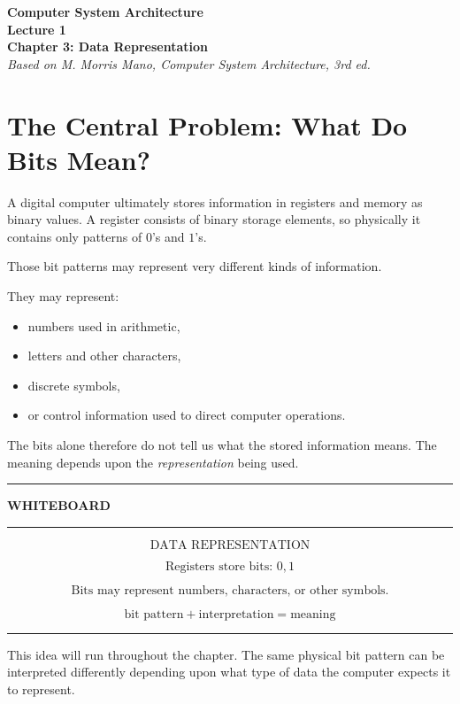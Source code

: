 \documentclass[11pt]{article}
\newenvironment{whiteboard}
{
    \par\medskip
    \begin{center}
    \begin{minipage}{0.94\textwidth}
    \hrule
    \vspace{0.4em}
    \textbf{\large WHITEBOARD}
    \vspace{0.3em}
    \hrule
    \vspace{0.7em}
}
{
    \vspace{0.5em}
    \hrule
    \end{minipage}
    \end{center}
    \medskip
}
\begin{document}
\begin{center}
    {\LARGE \textbf{Computer System Architecture}}\\[0.5em]
    {\LARGE \textbf{Lecture 1}}\\[0.5em]
    {\Large \textbf{Chapter 3: Data Representation}}\\[0.5em]
    \textit{Based on M. Morris Mano, Computer System Architecture, 3rd ed.}
\end{center}

\vspace{1em}

\section{The Central Problem: What Do Bits Mean?}

A digital computer ultimately stores information in registers and memory as
binary values. A register consists of binary storage elements, so physically it
contains only patterns of \(0\)'s and \(1\)'s.

Those bit patterns may represent very different kinds of information.

They may represent:

\begin{itemize}
    \item numbers used in arithmetic,
    \item letters and other characters,
    \item discrete symbols,
    \item or control information used to direct computer operations.
\end{itemize}

The bits alone therefore do not tell us what the stored information means.
The meaning depends upon the \emph{representation} being used.

\begin{whiteboard}
\[
\boxed{\text{DATA REPRESENTATION}}
\]

\[
\text{Registers store bits: }0,1
\]

\[
\text{Bits may represent numbers, characters, or other symbols.}
\]

\[
\boxed{\text{bit pattern}+\text{interpretation}=\text{meaning}}
\]
\end{whiteboard}

This idea will run throughout the chapter. The same physical bit pattern can
be interpreted differently depending upon what type of data the computer
expects it to represent.
\end{document}
